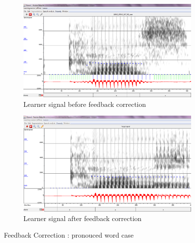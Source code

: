 \documentclass[11pt]{beamer}
\begin{document}
\begin{frame}
\begin{figure}
\begin{subfigure}{.5\textwidth}
  \centering
  \includegraphics[width=0.9\linewidth]{images/case_learner.PNG}
  \caption{Learner signal before feedback correction}
  \label{fig:sfig1}
\end{subfigure}%
\begin{subfigure}{.5\textwidth}
  \centering
  \includegraphics[width=0.9\linewidth]{images/case_target.PNG}
  \caption{Learner signal after feedback correction}
  \label{fig:sfig2}
\end{subfigure}
\caption{Feedback Correction : pronouced word case}
\label{fig:fig}
\end{figure}
\end{frame}
\end{document}
